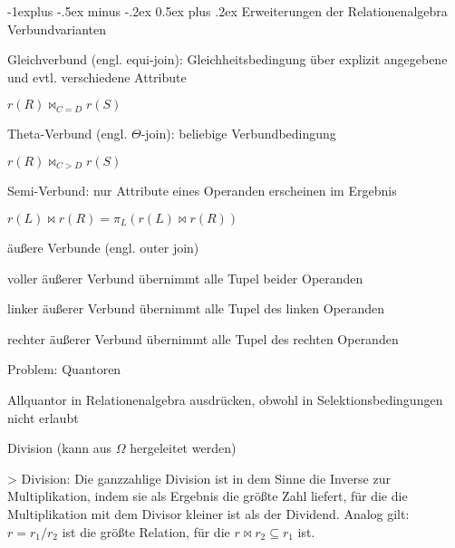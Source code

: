 \documentclass[a4paper]{article}
\makeatletter
\renewcommand{\subsection}{\@startsection{subsection}{2}{0mm}%
                                {-1explus -.5ex minus -.2ex}%
                                {0.5ex plus .2ex}%
                                {\normalfont\normalsize\bfseries}}
\makeatother
\begin{document}
\begin{multicols}{3}
\subsection{Erweiterungen der Relationenalgebra}
Verbundvarianten
\begin{itemize*}
    \item Gleichverbund (engl. equi-join): Gleichheitsbedingung über explizit angegebene und evtl. verschiedene Attribute
    \begin{itemize*}
        \item $r(R) \bowtie_{C=D} r(S)$
    \end{itemize*}
    \item Theta-Verbund (engl. $\Theta$-join): beliebige Verbundbedingung
    \begin{itemize*}
        \item $r(R) \bowtie_{C>D} r(S)$
    \end{itemize*}
    \item Semi-Verbund: nur Attribute eines Operanden erscheinen im Ergebnis
    \begin{itemize*}
        \item $r(L) \bowtie r(R) = \pi_L (r(L) \bowtie r(R))$
    \end{itemize*}
    \item äußere Verbunde (engl. outer join)
    \begin{itemize*}
        \item voller äußerer Verbund übernimmt alle Tupel beider Operanden
        \item linker äußerer Verbund übernimmt alle Tupel des linken Operanden
        \item rechter äußerer Verbund übernimmt alle Tupel des rechten Operanden
    \end{itemize*}
\end{itemize*}

Problem: Quantoren
\begin{itemize*}
    \item Allquantor in Relationenalgebra ausdrücken, obwohl in Selektionsbedingungen nicht erlaubt
    \item Division (kann aus $\Omega$ hergeleitet werden)
\end{itemize*}

> Division: Die ganzzahlige Division ist in dem Sinne die Inverse zur Multiplikation, indem sie als Ergebnis die größte Zahl liefert, für die die Multiplikation mit dem Divisor kleiner ist als der Dividend.
Analog gilt: $r = r_1 / r_2$ ist die größte Relation, für die $r \bowtie r_2 \subseteq r_1$ ist.


\end{multicols}
\end{document}
